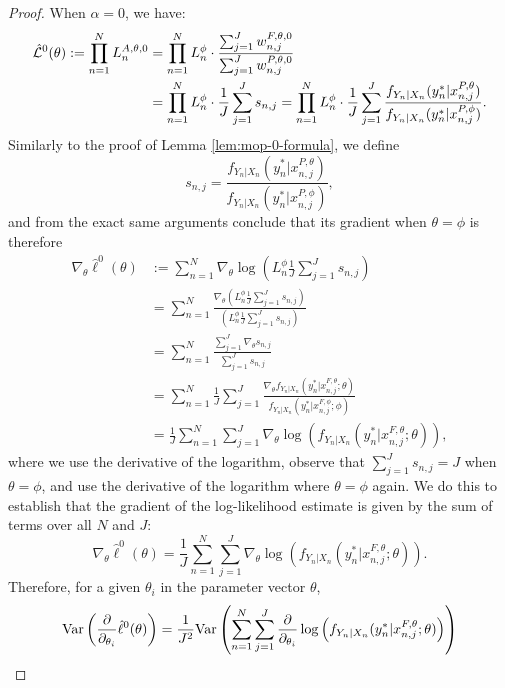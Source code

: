 \begin{proof}
When $\alpha=0$, we have:
\begin{align}
    \hat{\mathcal{L}}^0(\theta) := \prod_{n=1}^N L_n^{A, \theta, 0} &= \prod_{n=1}^N L_n^\phi \cdot \frac{\sum_{j=1}^J w_{n,j}^{F,\theta,0}}{\sum_{j=1}^J w_{n,j}^{P,\theta,0}} 
    \\&
    = \prod_{n=1}^N L_n^\phi \cdot \frac{1}{J}\sum_{j=1}^J s_{n,j} = \prod_{n=1}^N L_n^\phi \cdot \frac{1}{J}\sum_{j=1}^J \frac{f_{Y_n|X_n}(y_n^*|x_{n,j}^{P, \theta})}{f_{Y_n|X_n}(y_n^*|x_{n,j}^{P, \phi})}.
\end{align}
Similarly to the proof of Lemma \ref{lem:mop-0-formula}, we define 
\begin{equation}
s_{n,j}=\frac{f_{Y_n|X_n}(y_n^*|x_{n,j}^{P, \theta})}{f_{Y_n|X_n}(y_n^*|x_{n,j}^{P, \phi})},
\end{equation}
and from the exact same arguments conclude that its gradient when $\theta=\phi$ is therefore 
\begin{align}
    \nabla_\theta \hat{\ell}^0(\theta) &:= \sum_{n=1}^N \nabla_\theta \log\left(L_n^\phi \frac{1}{J} \sum_{j=1}^J s_{n,j}\right) \\
    &= \sum_{n=1}^N \frac{\nabla_\theta \left(L_n^\phi \frac{1}{J} \sum_{j=1}^J s_{n,j}\right)}{\left(L_n^\phi \frac{1}{J} \sum_{j=1}^J s_{n,j}\right)} \\
    &= \sum_{n=1}^N \frac{\sum_{j=1}^J \nabla_\theta s_{n,j}}{\sum_{j=1}^J s_{n,j}} \\
    &= \sum_{n=1}^N \frac{1}{J} \sum_{j=1}^J \frac{\nabla_\theta f_{Y_n|X_{n}}(y_n^*|x_{n,j}^{F, \theta}; \theta)}{f_{Y_n|X_{n}}(y_n^*|x_{n,j}^{F, \phi}; \phi)} \\
    &= \frac{1}{J} \sum_{n=1}^N \sum_{j=1}^J \nabla_\theta \log\left(f_{Y_n|X_{n}}(y_n^*|x_{n,j}^{F, \theta}; \theta)\right),
\end{align}
where we use the derivative of the logarithm, observe that $\sum_{j=1}^J s_{n,j} = J$ when $\theta=\phi$, and use the derivative of the logarithm where $\theta=\phi$ again. We do this to establish that the gradient of the log-likelihood estimate is given by the sum of terms over all $N$ and $J$:
\begin{equation}
\nabla_\theta \hat{\ell}^0(\theta) = \frac{1}{J} \sum_{n=1}^N \sum_{j=1}^J \nabla_\theta \log\left(f_{Y_n|X_{n}}(y_n^*|x_{n,j}^{F, \theta}; \theta)\right).
\end{equation}
Therefore, for a given $\theta_i$ in the parameter vector $\theta$,
\begin{align}
    \Var\left(\frac{\partial}{\partial_{\theta_i}} \hat\ell^0(\theta)\right) &= \frac{1}{J^2}\Var\left(\sum_{n=1}^N\sum_{j=1}^{J}\frac{\partial}{\partial_{\theta_i}} \log\left(f_{Y_n|X_{n}}(y_n^*|x_{n,j}^{F, \theta}; \theta)\right)\right) \\

\end{align}
\end{proof}
